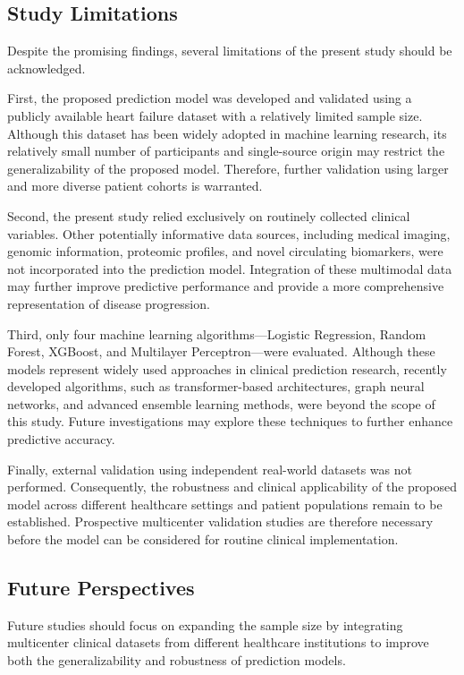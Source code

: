 \documentclass[12pt]{article}
\begin{document}
 
\subsection{Study Limitations}

Despite the promising findings, several limitations of the present study should be acknowledged.

First, the proposed prediction model was developed and validated using a publicly available heart failure dataset with a relatively limited sample size. Although this dataset has been widely adopted in machine learning research, its relatively small number of participants and single-source origin may restrict the generalizability of the proposed model. Therefore, further validation using larger and more diverse patient cohorts is warranted.

Second, the present study relied exclusively on routinely collected clinical variables. Other potentially informative data sources, including medical imaging, genomic information, proteomic profiles, and novel circulating biomarkers, were not incorporated into the prediction model. Integration of these multimodal data may further improve predictive performance and provide a more comprehensive representation of disease progression.

Third, only four machine learning algorithms—Logistic Regression, Random Forest, XGBoost, and Multilayer Perceptron—were evaluated. Although these models represent widely used approaches in clinical prediction research, recently developed algorithms, such as transformer-based architectures, graph neural networks, and advanced ensemble learning methods, were beyond the scope of this study. Future investigations may explore these techniques to further enhance predictive accuracy.

Finally, external validation using independent real-world datasets was not performed. Consequently, the robustness and clinical applicability of the proposed model across different healthcare settings and patient populations remain to be established. Prospective multicenter validation studies are therefore necessary before the model can be considered for routine clinical implementation. 

\subsection{Future Perspectives}

Future studies should focus on expanding the sample size by integrating multicenter clinical datasets from different healthcare institutions to improve both the generalizability and robustness of prediction models.
\end{document}
